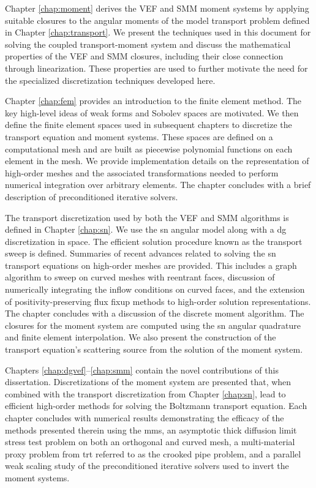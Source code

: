 \documentclass[../doc.tex]{subfiles}
\begin{document}
Chapter \ref{chap:moment} derives the VEF and SMM moment systems by applying suitable closures to the angular moments of the model transport problem defined in Chapter \ref{chap:transport}. We present the techniques used in this document for solving the coupled transport-moment system and discuss the mathematical properties of the VEF and SMM closures, including their close connection through linearization. These properties are used to further motivate the need for the specialized discretization techniques developed here. 

Chapter \ref{chap:fem} provides an introduction to the finite element method. The key high-level ideas of weak forms and Sobolev spaces are motivated. We then define the finite element spaces used in subsequent chapters to discretize the transport equation and moment systems. These spaces are defined on a computational mesh and are built as piecewise polynomial functions on each element in the mesh. We provide implementation details on the representation of high-order meshes and the associated transformations needed to perform numerical integration over arbitrary elements. The chapter concludes with a brief description of preconditioned iterative solvers. 

The transport discretization used by both the VEF and SMM algorithms is defined in Chapter \ref{chap:sn}. We use the \gls{sn} angular model along with a \gls{dg} discretization in space. The efficient solution procedure known as the transport sweep is defined. Summaries of recent advances related to solving the \gls{sn} transport equations on high-order meshes are provided. This includes a graph algorithm to sweep on curved meshes with reentrant faces, discussion of numerically integrating the inflow conditions on curved faces, and the extension of positivity-preserving flux fixup methods to high-order solution representations. The chapter concludes with a discussion of the discrete moment algorithm. The closures for the moment system are computed using the \gls{sn} angular quadrature and finite element interpolation. We also present the construction of the transport equation's scattering source from the solution of the moment system. 

Chapters \ref{chap:dgvef}--\ref{chap:smm} contain the novel contributions of this dissertation. Discretizations of the moment system are presented that, when combined with the transport discretization from Chapter \ref{chap:sn}, lead to efficient high-order methods for solving the Boltzmann transport equation. Each chapter concludes with numerical results demonstrating the efficacy of the methods presented therein using the \gls{mms}, an asymptotic thick diffusion limit stress test problem on both an orthogonal and curved mesh, a multi-material proxy problem from \gls{trt} referred to as the crooked pipe problem, and a parallel weak scaling study of the preconditioned iterative solvers used to invert the moment systems. 
\end{document}
